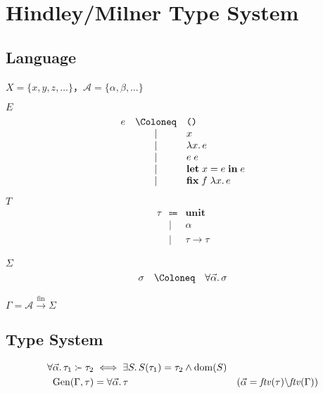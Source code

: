 \section{Hindley/Milner Type System}

\cite{Lee:1998}

\subsection{Language}

$X = \{x,y,z,\ldots\}$，$\mathcal{A} = \{\alpha, \beta, \ldots\}$

$E$
\begin{align*}
  \begin{array}{rcll}
    e
    & \Coloneq & \text{\texttt{()}} \\
    & \mid & x \\
    & \mid & \lambda x\ldotp e \\
    & \mid & e\; e \\
    & \mid & \mathbf{let}\;x = e\;\mathbf{in}\;e \\
    & \mid & \mathbf{fix}\;f\;\lambda x\ldotp e
  \end{array}
\end{align*}

$T$
\begin{align*}
  \begin{array}{rcll}
    \tau
    & \Coloneq & \mathbf{unit} \\
    & \mid & \alpha \\
    & \mid & \tau \to \tau
  \end{array}
\end{align*}

$\Sigma$
\begin{align*}
  \begin{array}{rcll}
    \sigma
    & \Coloneq & \forall \vec{\alpha}\ldotp \sigma
  \end{array}
\end{align*}

$\Gamma = \mathcal{A} \xrightarrow{\mathrm{fin}} \Sigma$

\subsection{Type System}

\begin{align*}
  \forall \vec{\alpha}\ldotp \tau_1 \succ \tau_2 &\iff \exists S\ldotp S(\tau_1) = \tau_2 \land \mathrm{dom}(S) \\
  \mathrm{Gen}(\Gamma, \tau) &= \forall \vec{\alpha}\ldotp \tau &(\vec{\alpha} = \mathit{ftv}(\tau) \backslash \mathit{ftv}(\Gamma))
\end{align*}

